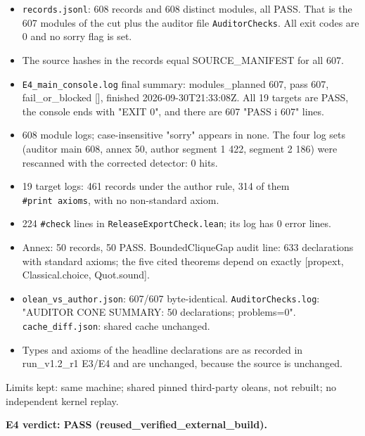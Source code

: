 \documentclass[
]{article}
\providecommand{\tightlist}{%
  \setlength{\itemsep}{0pt}\setlength{\parskip}{0pt}}
\begin{document}
\begin{itemize}
\tightlist
\item
  \texttt{records.jsonl}: 608 records and 608 distinct modules, all
  PASS. That is the 607 modules of the cut plus the auditor file
  \texttt{AuditorChecks}. All exit codes are 0 and no sorry flag is set.
\item
  The source hashes in the records equal SOURCE\_MANIFEST for all 607.
\item
  \texttt{E4\_main\_console.log} final summary: modules\_planned 607,
  pass 607, fail\_or\_blocked {[}{]}, finished 2026-09-30T21:33:08Z. All
  19 targets are PASS, the console ends with "EXIT 0", and there are 607
  "PASS i 607" lines.
\item
  608 module logs; case-insensitive "sorry" appears in none. The four
  log sets (auditor main 608, annex 50, author segment 1 422, segment 2
  186) were rescanned with the corrected detector: 0 hits.
\item
  19 target logs: 461 records under the author rule, 314 of them
  \texttt{\#print\ axioms}, with no non-standard axiom.
\item
  224 \texttt{\#check} lines in \texttt{ReleaseExportCheck.lean}; its
  log has 0 error lines.
\item
  Annex: 50 records, 50 PASS. BoundedCliqueGap audit line: 633
  declarations with standard axioms; the five cited theorems depend on
  exactly {[}propext, Classical.choice, Quot.sound{]}.
\item
  \texttt{olean\_vs\_author.json}: 607/607 byte-identical.
  \texttt{AuditorChecks.log}: "AUDITOR CONE SUMMARY: 50 declarations;
  problems=0". \texttt{cache\_diff.json}: shared cache unchanged.
\item
  Types and axioms of the headline declarations are as recorded in
  run\_v1.2\_r1 E3/E4 and are unchanged, because the source is
  unchanged.
\end{itemize}

Limits kept: same machine; shared pinned third-party oleans, not
rebuilt; no independent kernel replay.

\textbf{E4 verdict: PASS (reused\_verified\_external\_build).}
\end{document}
